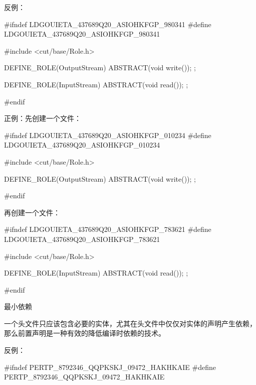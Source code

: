 \begin{content}
反例：
\begin{leftbar}
\begin{c++}[caption={\ttfamily{io/Stream.h}}]
#ifndef LDGOUIETA_437689Q20_ASIOHKFGP_980341
#define LDGOUIETA_437689Q20_ASIOHKFGP_980341

#include <cut/base/Role.h>

DEFINE_ROLE(OutputStream)
{
    ABSTRACT(void write());
};

DEFINE_ROLE(InputStream)
{
    ABSTRACT(void read());
};

#endif
\end{c++}
\end{leftbar}

正例：先创建一个文件：
\begin{leftbar}
\begin{c++}[caption={\ttfamily{io/OutputStream.h}}]
#ifndef LDGOUIETA_437689Q20_ASIOHKFGP_010234
#define LDGOUIETA_437689Q20_ASIOHKFGP_010234
    
#include <cut/base/Role.h>

DEFINE_ROLE(OutputStream)
{
    ABSTRACT(void write());
};

#endif
\end{c++}
\end{leftbar}

再创建一个文件：

\begin{leftbar}
\begin{c++}[caption={\ttfamily{io/InputStream.h}}]
#ifndef LDGOUIETA_437689Q20_ASIOHKFGP_783621
#define LDGOUIETA_437689Q20_ASIOHKFGP_783621

#include <cut/base/Role.h>

DEFINE_ROLE(InputStream)
{
    ABSTRACT(void read());
};

#endif
\end{c++}
\end{leftbar}

\begin{principle}
最小依赖
\end{principle}

一个头文件只应该包含必要的实体，尤其在头文件中仅仅对实体的声明产生依赖，那么前置声明是一种有效的降低编译时依赖的技术。

反例：
\begin{leftbar}
\begin{c++}[caption={\ttfamily{cut/core/Test.h}}]
#ifndef PERTP_8792346_QQPKSKJ_09472_HAKHKAIE
#define PERTP_8792346_QQPKSKJ_09472_HAKHKAIE


\end{c++}
\end{leftbar}
\end{content}
